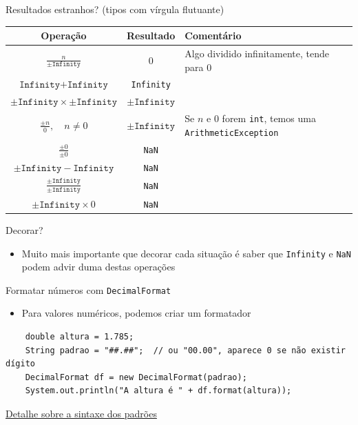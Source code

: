 \documentclass[portuguese, aspectratio=169, xcolor=table]{beamer}
\begin{document}
\begin{frame}{Resultados estranhos? (tipos com vírgula flutuante)}
\begin{center}
    \begin{tabular}{ccl}
\textbf{Operação} & \textbf{Resultado} & \textbf{Comentário}\\
\hline
$\frac{n}{\pm \texttt{Infinity}}$ & 0 & Algo dividido infinitamente, tende para 0\\
$\texttt{Infinity}  + \texttt{Infinity}$  &  \texttt{Infinity} & \\
$\pm \texttt{Infinity} \times \pm \texttt{Infinity}$ & $\pm \texttt{Infinity}$\\
$\frac{\pm n}{0}, \quad n \neq 0$        &   $\pm \texttt{Infinity}$ & \scriptsize Se $n$ e 0 forem \texttt{int}, temos uma \texttt{ArithmeticException}\\
$\frac{\pm 0}{\pm 0}$      &  \texttt{NaN}\\
$\pm \texttt{Infinity} - \texttt{Infinity}$ &   \texttt{NaN}\\
$\frac{\pm \texttt{Infinity}}{\pm \texttt{Infinity}}$  & \texttt{NaN}\\
$\pm \texttt{Infinity} \times 0$      &  \texttt{NaN}\\
\end{tabular}
\end{center}
\begin{block}{Decorar?}
\begin{itemize}
    \item Muito mais importante que decorar cada situação é saber que \texttt{Infinity} e \texttt{NaN} podem advir duma destas operações
\end{itemize}
\end{block}
\end{frame}


\begin{frame}[fragile]{Formatar números com \texttt{DecimalFormat}}
\begin{itemize}
    \item Para valores numéricos, podemos criar um formatador
\end{itemize}
\vspace{0.5cm}
\begin{verbatim}
    double altura = 1.785;
    String padrao = "##.##";  // ou "00.00", aparece 0 se não existir dígito
    DecimalFormat df = new DecimalFormat(padrao);
    System.out.println("A altura é " + df.format(altura));
\end{verbatim}
\vfill

\begin{center}
    \href{https://docs.oracle.com/javase/tutorial/i18n/format/decimalFormat.html#numberpattern}{Detalhe sobre a sintaxe dos padrões}
\end{center}
\end{frame}
\end{document}
